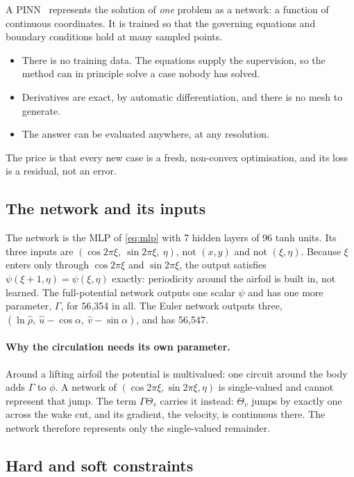 A PINN~\cite{raissi2019pinn} represents the solution of \emph{one} problem as a network: a function
of continuous coordinates. It is trained so that the governing equations and boundary conditions
hold at many sampled points.
\begin{itemize}
  \item There is no training data. The equations supply the supervision, so the method can in
    principle solve a case nobody has solved.
  \item Derivatives are exact, by automatic differentiation, and there is no mesh to generate.
  \item The answer can be evaluated anywhere, at any resolution.
\end{itemize}
The price is that every new case is a fresh, non-convex optimisation, and its loss is a residual,
not an error.

\subsection{The network and its inputs}

The network is the MLP of \cref{eq:mlp} with 7 hidden layers of 96 tanh units. Its three inputs are
$(\cos2\pi\xi,\ \sin2\pi\xi,\ \eta)$, not $(x,y)$ and not $(\xi,\eta)$. Because $\xi$ enters only
through $\cos2\pi\xi$ and $\sin2\pi\xi$, the output satisfies $\psi(\xi + 1,\eta) = \psi(\xi,\eta)$
exactly: periodicity around the airfoil is built in, not learned. The full-potential network
outputs one scalar $\psi$ and has one more parameter, $\Gamma$, for 56,354 in all. The Euler network
outputs three, $(\ln\hat\rho,\ \hat u - \cos\alpha,\ \hat v - \sin\alpha)$, and has 56,547.

\paragraph{Why the circulation needs its own parameter.}
Around a lifting airfoil the potential is multivalued: one circuit around the body adds $\Gamma$ to
$\phi$. A network of $(\cos2\pi\xi, \sin2\pi\xi, \eta)$ is single-valued and cannot represent that
jump. The term $\Gamma\Theta_v$ carries it instead: $\Theta_v$ jumps by exactly one across the wake
cut, and its gradient, the velocity, is continuous there. The network therefore represents only
the single-valued remainder.

\subsection{Hard and soft constraints}


